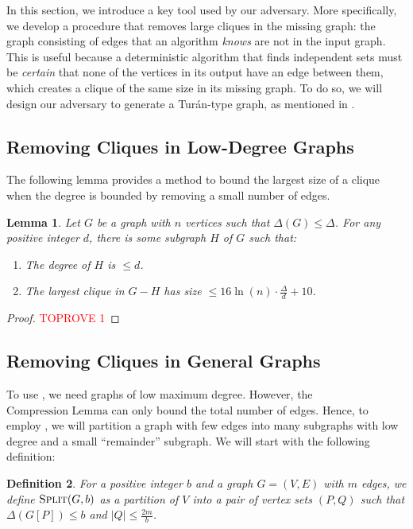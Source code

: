 \documentclass[11pt]{article}
\newtheorem{lemma}{Lemma}[section]
\newtheorem{definition}[lemma]{Definition}
\theoremstyle{definition}
\renewcommand{\leq}{\leqslant}
\renewcommand{\le}{\leq}
\begin{document}
\indent In this section, we introduce a key tool used by our adversary. More specifically, we develop a procedure that removes large cliques in the missing graph: the graph consisting of edges that an algorithm \textit{knows} are not in the input graph. This is useful because a deterministic algorithm that finds independent sets must be \textit{certain} that none of the vertices in its output have an edge between them, which creates a clique of the same size in its missing graph. To do so, we will design our adversary to generate a Tur\'an-type graph, as mentioned in .

\subsection{Removing Cliques in Low-Degree Graphs}
The following lemma provides a method to bound the largest size of a clique when the degree is bounded by removing a small number of edges.

\begin{lemma}\label{clique-removal}
Let $G$ be a graph with $n$ vertices such that $\Delta{(G)}\le \Delta$. For any positive integer $d$, there is some subgraph $H$ of $G$ such that:
\begin{enumerate}
    \item\label{S-degree} The degree of $H$ is $\le d$.
    \item\label{clique-size} The largest clique in $G-H$ has size $\le 16\ln(n)\cdot \frac {\Delta}d + 10$.
\end{enumerate}
\end{lemma}
\begin{proof}\textcolor{red}{TOPROVE 1}\end{proof}

\subsection{Removing Cliques in General Graphs}
\noindent
To use , we need graphs of low maximum degree. However, the $\hyperref[compression]{\text{Compression Lemma}}$ can only bound the total number of edges. Hence, to employ , we will partition a graph with few edges into many subgraphs with low degree and a small ``remainder'' subgraph. We will start with the following definition:

\newcommand{\graphSplit}{\textnormal{\textsc{Split}}}

\begin{definition}
    For a positive integer $b$ and a graph $G=(V, E)$ with $m$ edges, we define $\graphSplit(G, b)$ as a partition of $V$ into a pair of vertex sets $(P, Q)$ such that $\Delta{(G[P])}\le b$ and $|Q|\le \frac{2m}b$.
\end{definition}
\end{document}
